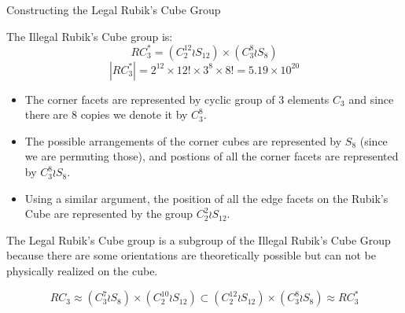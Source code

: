 \documentclass[final]{beamer}
\newlength{\colwidth}
\begin{document}
\begin{frame}[t]
\begin{columns}[t]
\begin{column}{\colwidth}

  \begin{block}{Constructing the Legal Rubik's Cube Group}
    


    
    The Illegal Rubik's Cube group is:
    $$RC^{*}_{3} = (C^{12}_2 \wr S_{12}) \times (C^8_3 \wr S_8)$$
    $$|RC^{*}_{3}| = 2^{12} \times 12! \times 3^8 \times 8! = 5.19 \times 10^{20}$$
    
\begin{itemize} 
\item The corner facets are represented by cyclic group of 3 elements $C_{3}$ and since there are $8$ copies we denote it by $C_3 ^8$.
\item The possible arrangements of the corner cubes are represented by $S_{8}$ (since we are permuting those), and postions of all the corner facets are represented by $C_{3}^{8} \wr S_{8}$.
\item Using a similar argument, the position of all the edge facets on the Rubik's Cube are represented by the group $C_{2}^{2} \wr S_{12}$.
\end{itemize} 

    The Legal Rubik's Cube group is a subgroup of the Illegal Rubik's Cube Group because there are some orientations are theoretically possible but can not be physically realized on the cube.

$$RC_{3} \approx (C_{3}^{7} \wr S_{8}) \times (C_{2}^{10} \wr S_{12}) \subset  (C^{12}_2 \wr S_{12}) \times (C^8_3 \wr S_8) \approx RC^{*}_{3}$$


    

\end{block}
\end{column}
\end{columns}
\end{frame}
\end{document}
